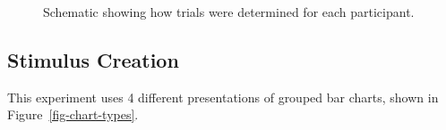 \documentclass[runningheads
]{llncs}
\begin{document}
\begin{figure}


\caption{\label{fig-design}Schematic showing how trials were determined
for each participant.}

\end{figure}%

\subsection{Stimulus Creation}\label{stimulus-creation}

This experiment uses 4 different presentations of grouped bar charts,
shown in Figure~\ref{fig-chart-types}.
\end{document}

